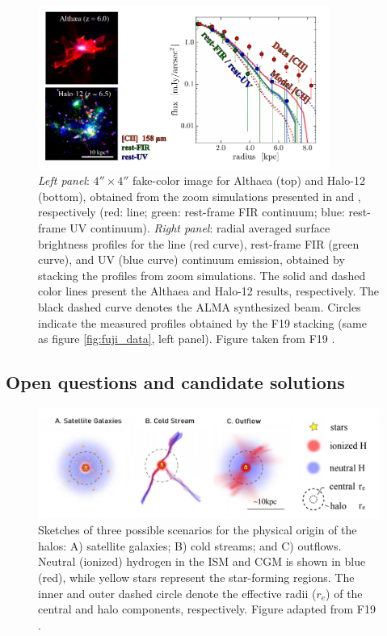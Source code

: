 \begin{figure}[t]
    \centering
    \includegraphics[width=0.85\textwidth]{plots/pallo_sim_halos.PNG}
    \caption{\textit{Left panel}: $4''\times4''$ fake-color image for Althaea (top) and Halo-12 (bottom), obtained from the zoom simulations presented in \citet{pallottini2017} and \citet{arata2019radiative}, respectively (red: \CII line; green: rest-frame FIR continuum; blue: rest-frame UV continuum). \textit{Right panel}: radial averaged surface brightness profiles for the \CII line (red curve), rest-frame FIR (green curve), and UV (blue curve) continuum emission, obtained by stacking the profiles from zoom simulations. The solid and dashed color lines present the Althaea and Halo-12 results, respectively. The black dashed curve denotes the ALMA synthesized beam. Circles indicate the measured profiles obtained by the F19 stacking \citep{Fujimoto19} (same as figure \ref{fig:fuji_data}, left panel). Figure taken from F19 \citep{Fujimoto19}.
    }
    \label{fig:simulations_halos}
\end{figure}

\subsection{Open questions and candidate solutions}

\begin{figure}
    \centering
    \includegraphics[width=1.0\textwidth]{plots/solutions_final.png}
    \caption{Sketches of three possible scenarios for the physical origin of the \CII halos: A) satellite galaxies; B) cold streams; and C) outflows. Neutral (ionized) hydrogen in the ISM and CGM is shown in blue (red), while yellow stars represent the star-forming regions. The inner and outer dashed circle denote the effective radii ($r_e$) of the central and \CII halo components, respectively. Figure adapted from F19 \citep{Fujimoto19}.
    }
    \label{fig:solutions_halos}
\end{figure}

